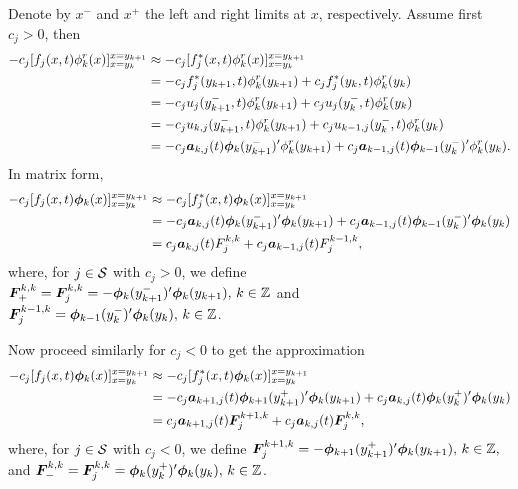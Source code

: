 Denote by \(x^-\) and \(x^+\) the left and right limits at \(x\), respectively. Assume first \(c_j>0\), then 
\begin{align*}
	-c_j[f_j(x,t)\phi^r_k(x)]_{x=y_k}^{x=y_{k+1}} & \approx -c_j[f_j^*(x,t)\phi^r_k(x)]_{x=y_k}^{x=y_{k+1}}
	\\& = -c_jf_j^*(y_{k+1},t)\phi^r_k(y_{k+1}) + c_jf_j^*(y_{k},t)\phi^r_k(y_{k})
	\\& = -c_ju_j(y_{k+1}^-,t)\phi^r_k(y_{k+1}) + c_ju_j(y_{k}^-,t)\phi^r_k(y_{k})
	\\& = -c_ju_{k,j}(y_{k+1}^-,t)\phi^r_k(y_{k+1}) + c_ju_{k-1,j}(y_{k}^-,t)\phi^r_k(y_{k})
	\\& = -c_j\boldsymbol a_{k,j}(t)\boldsymbol \phi_k(y_{k+1}^-)'{}\phi^r_k(y_{k+1}) + c_j\boldsymbol a_{k-1,j}(t)\boldsymbol \phi_{k-1}(y_{k}^-)'{}\phi^r_k(y_{k}).
\end{align*}
In matrix form,  
\begin{align*}
	-c_j[f_j(x,t)\boldsymbol\phi_k(x)]_{x=y_k}^{x=y_{k+1}} & \approx -c_j[f_j^*(x,t)\boldsymbol\phi_k(x)]_{x=y_k}^{x=y_{k+1}}
	\\& = -c_j\boldsymbol a_{k,j}(t)\boldsymbol \phi_k(y_{k+1}^-)'{}\boldsymbol\phi_k(y_{k+1}) + c_j\boldsymbol a_{k-1,j}(t)\boldsymbol \phi_{k-1}(y_{k}^-)'{}\boldsymbol\phi_k(y_{k})
	\\& = c_j\boldsymbol a_{k,j}(t)F_j^{k,k}+c_j\boldsymbol a_{k-1,j}(t)F_j^{k-1,k},
\end{align*}
where, for \(j\in \mathcal{S}\) with \(c_j>0\), we define \(\boldsymbol F_+^{k,k}=\boldsymbol F_j^{k,k} = -\boldsymbol \phi_k(y_{k+1}^-)'{}\boldsymbol\phi_k(y_{k+1}),\,k\in\mathbb Z\) and \(\boldsymbol F_j^{k-1,k} = \boldsymbol \phi_{k-1}(y_{k}^-)'{}\boldsymbol\phi_k(y_{k}),\,k\in\mathbb Z\).

Now proceed similarly for \(c_j<0\) to get the approximation 
\begin{align*}
	-c_j[f_j(x,t)\boldsymbol\phi_k(x)]_{x=y_k}^{x=y_{k+1}} & \approx -c_j[f_j^*(x,t)\boldsymbol\phi_k(x)]_{x=y_k}^{x=y_{k+1}}
	\\& = -c_j\boldsymbol a_{k+1,j}(t)\boldsymbol \phi_{k+1}(y_{k+1}^+)'{}\boldsymbol\phi_k(y_{k+1}) + c_j\boldsymbol a_{k,j}(t)\boldsymbol \phi_{k}(y_{k}^+)'{}\boldsymbol\phi_k(y_{k})
	\\& = c_j\boldsymbol a_{k+1,j}(t)\boldsymbol F_j^{k+1,k}+c_j\boldsymbol a_{k,j}(t)\boldsymbol F_j^{k,k},
\end{align*}
where, for \(j\in \mathcal{S}\) with \(c_j<0\), we define \(\boldsymbol F_j^{k+1,k} = -\boldsymbol \phi_{k+1}(y_{k+1}^+)'{}\boldsymbol\phi_k(y_{k+1}),\,k\in\mathbb Z,\) and \(\boldsymbol F_-^{k,k}=\boldsymbol F_j^{k,k} = \boldsymbol \phi_{k}(y_{k}^+)'{}\boldsymbol\phi_k(y_{k}),\,k\in\mathbb Z\).

